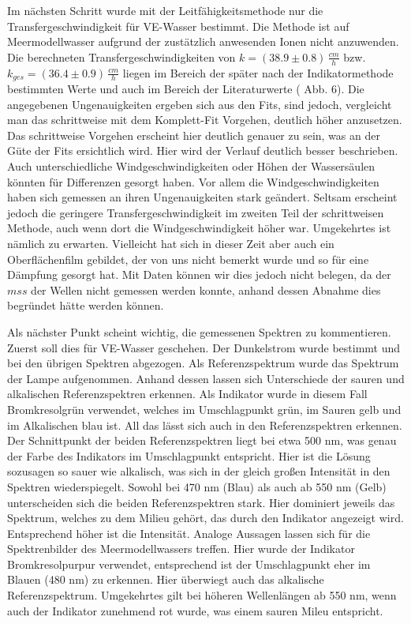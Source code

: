 \documentclass[12pt]{article}
\begin{document}
Im nächsten Schritt wurde mit der Leitfähigkeitsmethode nur die Transfergeschwindigkeit für VE-Wasser bestimmt. Die Methode ist auf Meermodellwasser aufgrund der zustätzlich anwesenden Ionen nicht anzuwenden. Die berechneten Transfergeschwindigkeiten von $k = (38.9 \pm 0.8)\, \frac{cm}{h}$ bzw. $k_{ges} = (36.4 \pm 0.9)\, \frac{cm}{h}$ liegen im Bereich der später nach der Indikatormethode bestimmten Werte und auch im Bereich der Literaturwerte (\cite{jaehne} Abb. 6). Die angegebenen Ungenauigkeiten ergeben sich aus den Fits, sind jedoch, vergleicht man das schrittweise mit dem Komplett-Fit Vorgehen, deutlich höher anzusetzen. Das schrittweise Vorgehen erscheint hier deutlich genauer zu sein, was an der Güte der Fits ersichtlich wird. Hier wird der Verlauf deutlich besser beschrieben. Auch unterschiedliche Windgeschwindigkeiten oder Höhen der Wassersäulen könnten für Differenzen gesorgt haben. Vor allem die Windgeschwindigkeiten haben sich gemessen an ihren Ungenauigkeiten stark geändert. Seltsam erscheint jedoch die geringere Transfergeschwindigkeit im zweiten Teil der schrittweisen Methode, auch wenn dort die Windgeschwindigkeit höher war. Umgekehrtes ist nämlich zu erwarten. Vielleicht hat sich in dieser Zeit aber auch ein Oberflächenfilm gebildet, der von uns nicht bemerkt wurde und so für eine Dämpfung gesorgt hat. Mit Daten können wir dies jedoch nicht belegen, da der $mss$ der Wellen nicht gemessen werden konnte, anhand dessen Abnahme dies begründet hätte werden können.

Als nächster Punkt scheint wichtig, die gemessenen Spektren zu kommentieren. Zuerst soll dies für VE-Wasser geschehen. Der Dunkelstrom wurde bestimmt und bei den übrigen Spektren abgezogen. Als Referenzspektrum wurde das Spektrum der Lampe aufgenommen. Anhand dessen lassen sich Unterschiede der sauren und alkalischen Referenzspektren erkennen. Als Indikator wurde in diesem Fall Bromkresolgrün verwendet, welches im Umschlagpunkt grün, im Sauren gelb und im Alkalischen blau ist. All das lässt sich auch in den Referenzspektren erkennen. Der Schnittpunkt der beiden Referenzspektren liegt bei etwa 500 nm, was genau der Farbe des Indikators im Umschlagpunkt entspricht. Hier ist die Lösung sozusagen so sauer wie alkalisch, was sich in der gleich großen Intensität in den Spektren wiederspiegelt. Sowohl bei 470 nm (Blau) als auch ab 550 nm (Gelb) unterscheiden sich die beiden Referenzspektren stark. Hier dominiert jeweils das Spektrum, welches zu dem Milieu gehört, das durch den Indikator angezeigt wird. Entsprechend höher ist die Intensität.
Analoge Aussagen lassen sich für die Spektrenbilder des Meermodellwassers treffen. Hier wurde der Indikator Bromkresolpurpur verwendet, entsprechend ist der Umschlagpunkt eher im Blauen (480 nm) zu erkennen. Hier überwiegt auch das alkalische Referenzspektrum. Umgekehrtes gilt bei höheren Wellenlängen ab 550 nm, wenn auch der Indikator zunehmend rot wurde, was einem sauren Mileu entspricht.
\end{document}

